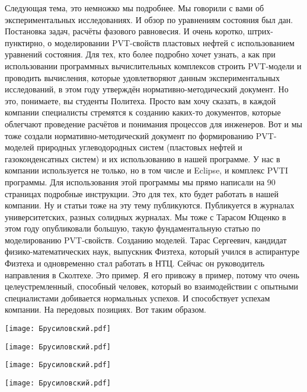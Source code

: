 \documentclass[main.tex]{subfiles}
\begin{document}
Следующая тема, это немножко мы подробнее.
Мы говорили с вами об экспериментальных исследованиях.
И обзор по уравнениям состояния был дан.
Постановка задач, расчёты фазового равновесия.
И очень коротко, штрих-пунктирно, о моделировании PVT-свойств пластовых нефтей с использованием уравнений состояния.
Для тех, кто более подробно хочет узнать, а как при использовании программных вычислительных комплексов строить PVT-модели и проводить вычисления, которые удовлетворяют данным экспериментальных исследований, в этом году утверждён нормативно-методический документ.
Но это, понимаете, вы студенты Политеха.
Просто вам хочу сказать, в каждой компании специалисты стремятся к созданию каких-то документов, которые облегчают проведение расчётов и понимания процессов для инженеров.
Вот и мы тоже создали нормативно-методический документ по формированию PVT-моделей природных углеводородных систем (пластовых нефтей и газоконденсатных систем) и их использованию в нашей программе.
У нас в компании используется не только, но в том числе и Eclipse, и комплекс PVTI программы.
Для использования этой программы мы прямо написали на 90 страницах подробные инструкции.
Это для тех, кто будет работать в нашей компании.
Ну и статьи тоже на эту тему публикуются.
Публикуется в журналах университетских, разных солидных журналах.
Мы тоже с Тарасом Ющенко в этом году опубликовали большую, такую фундаментальную статью по моделированию PVT-свойств.
Созданию моделей.
Тарас Сергеевич, кандидат физико-математических наук, выпускник Физтеха, который учился в аспирантуре Физтеха и одновременно стал работать в НТЦ.
Сейчас он руководитель направления в Сколтехе.
Это пример.
Я его привожу в пример, потому что очень целеустремленный, способный человек, который во взаимодействии с опытными специалистами добивается нормальных успехов.
И способствует успехам компании.
На передовых позициях.
Вот таким образом.

\begin{center}
\texttt{[image: Брусиловский.pdf]}
\end{center}

\begin{center}
\texttt{[image: Брусиловский.pdf]}
\end{center}

\begin{center}
\texttt{[image: Брусиловский.pdf]}
\end{center}

\begin{center}
\texttt{[image: Брусиловский.pdf]}
\end{center}
\end{document}
